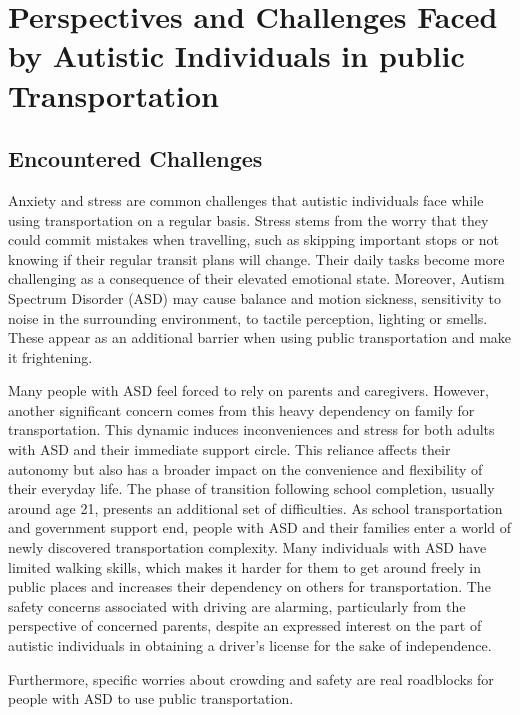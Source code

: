 \section{Perspectives and Challenges Faced by Autistic Individuals in public Transportation}

\subsection{Encountered Challenges}

Anxiety and stress are common challenges that autistic individuals face while using transportation on a regular basis\cite{2020ExperiencesYoungAutistic}. Stress stems from the worry that they could commit mistakes when travelling, such as skipping important stops or not knowing if their regular transit plans will change. Their daily tasks become more challenging as a consequence of their elevated emotional state.  Moreover, Autism Spectrum Disorder (ASD) may cause balance and motion sickness, sensitivity to noise in the surrounding environment, to tactile perception, lighting or smells. These appear as an additional barrier when using public transportation and make it frightening.

Many people with ASD feel forced to rely on parents and caregivers. However, another significant concern comes from this heavy dependency on family for transportation. This dynamic induces inconveniences and stress for both adults with ASD and their immediate support circle\cite{2015DetourRightPlace}. This reliance affects their autonomy but also has a broader impact on the convenience and flexibility of their everyday life. The phase of transition following school completion, usually around age 21, presents an additional set of difficulties. As school transportation and government support end,  people with ASD and their families enter a world of newly discovered transportation complexity. Many individuals with ASD have limited walking skills, which makes it harder for them to get around freely in public places and increases their dependency on others for transportation. The safety concerns associated with driving are alarming, particularly from the perspective of concerned parents, despite an expressed interest on the part of autistic individuals in obtaining a driver's license for the sake of independence. 

Furthermore, specific worries about crowding and safety are real roadblocks for people with ASD to use public transportation\cite{2015ViewpointsAdultsAutism}.  


